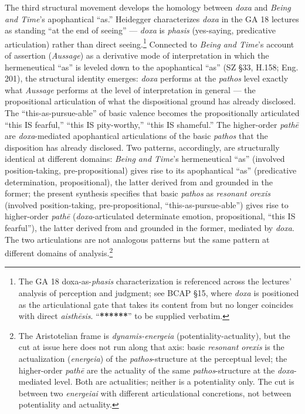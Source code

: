 The third structural movement develops the homology between \textit{doxa} and \textit{Being and Time}'s apophantical ``as.'' Heidegger characterizes \textit{doxa} in the GA 18 lectures as standing ``at the end of seeing'' --- \textit{doxa} is \textit{phasis} (yes-saying, predicative articulation) rather than direct seeing.\footnote{The GA 18 doxa-as-\textit{phasis} characterization is referenced across the lectures' analysis of perception and judgment; see BCAP \S15, where \textit{doxa} is positioned as the articulational gate that takes its content from but no longer coincides with direct \textit{aisthēsis}. ``\textbf{******}'' to be supplied verbatim.} Connected to \textit{Being and Time}'s account of assertion (\textit{Aussage}) as a derivative mode of interpretation in which the hermeneutical ``as'' is leveled down to the apophantical ``as'' (SZ \S33, H.158; Eng. 201), the structural identity emerges: \textit{doxa} performs at the \textit{pathos} level exactly what \textit{Aussage} performs at the level of interpretation in general --- the propositional articulation of what the dispositional ground has already disclosed. The ``this-as-pursue-able'' of basic valence becomes the propositionally articulated ``this IS fearful,'' ``this IS pity-worthy,'' ``this IS shameful.'' The higher-order \textit{pathē} are \textit{doxa}-mediated apophantical articulations of the basic \textit{pathos} that the disposition has already disclosed. Two patterns, accordingly, are structurally identical at different domains: \textit{Being and Time}'s hermeneutical ``as'' (involved position-taking, pre-propositional) gives rise to its apophantical ``as'' (predicative determination, propositional), the latter derived from and grounded in the former; the present synthesis specifies that basic \textit{pathos} as \textit{resonant orexis} (involved position-taking, pre-propositional, ``this-as-pursue-able'') gives rise to higher-order \textit{pathē} (\textit{doxa}-articulated determinate emotion, propositional, ``this IS fearful''), the latter derived from and grounded in the former, mediated by \textit{doxa}. The two articulations are not analogous patterns but the same pattern at different domains of analysis.\footnote{The Aristotelian frame is \textit{dynamis-energeia} (potentiality-actuality), but the cut at issue here does not run along that axis: basic \textit{resonant orexis} is the actualization (\textit{energeia}) of the \textit{pathos}-structure at the perceptual level; the higher-order \textit{pathē} are the actuality of the same \textit{pathos}-structure at the \textit{doxa}-mediated level. Both are actualities; neither is a potentiality only. The cut is between two \textit{energeiai} with different articulational concretions, not between potentiality and actuality.}

